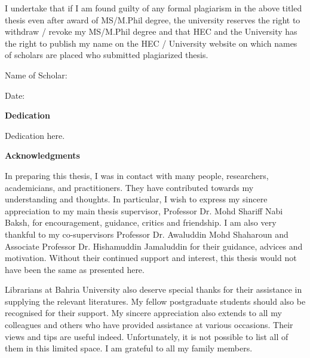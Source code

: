 I undertake that if I am found guilty of any formal plagiarism in the above titled thesis even after award of MS/M.Phil degree, the university reserves the right to withdraw / revoke my MS/M.Phil degree and that HEC and the
University has the right to publish my name on the HEC / University website on which names of scholars are placed who submitted plagiarized thesis.

\vskip 0.2in

\hspace{50mm}Name of Scholar: \AuthorName

\vskip 0.1in

\hspace{50mm}Date:


\newpage
{}
\begin{center}
	\large \textbf{Dedication}
\end{center}
\vskip 3in
\begin{flushright}
	Dedication here.
\end{flushright}


\newpage
{}
\begin{center}
	\large \textbf{Acknowledgments}
\end{center}
\vskip 0.45in
In preparing this thesis, I was in contact with many people, researchers,
academicians, and practitioners. They have contributed towards my understanding and
thoughts. In particular, I wish to express my sincere appreciation to my main thesis
supervisor, Professor Dr. Mohd Shariff Nabi Baksh, for encouragement, guidance, critics
and friendship. I am also very thankful to my co-supervisors Professor Dr. Awaluddin
Mohd Shaharoun and Associate Professor Dr. Hishamuddin Jamaluddin for their
guidance, advices and motivation. Without their continued support and interest, this
thesis would not have been the same as presented here.

Librarians at Bahria University also deserve special thanks for their
assistance in supplying the relevant literatures. My fellow postgraduate students
should also be recognised for their support. My sincere appreciation also extends to
all my colleagues and others who have provided assistance at various occasions.
Their views and tips are useful indeed. Unfortunately, it is not possible to list all of
them in this limited space. I am grateful to all my family members.
